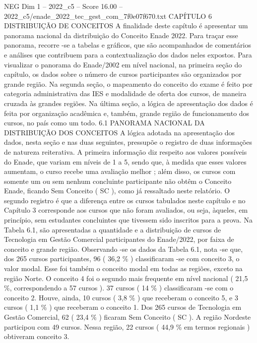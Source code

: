 \begin{textsample}{NEG Dim 1 – 2022\_c5 – Score 16.00 – 2022\_c5/enade\_2022\_tec\_gest\_com\_7f0e07f670.txt}  \label{ex:f1_neg_414}
CAPÍTULO 6 DISTRIBUIÇÃO DE CONCEITOS A finalidade deste capítulo é apresentar um panorama nacional da distribuição do Conceito Enade 2022.
Para traçar esse panorama, recorre -se a tabelas e gráficos, que são acompanhados de comentários e análises que contribuem para a contextualização dos dados neles expostos.
Para visualizar o panorama do Enade/2002 em nível nacional, na primeira seção do capítulo, os dados sobre o número de cursos participantes são organizados por grande região.
Na segunda seção, o mapeamento do conceito do exame é feito por categoria administrativa das IES e modalidade de oferta dos cursos, de maneira cruzada às grandes regiões.
Na última seção, a lógica de apresentação dos dados é feita por organização acadêmica e, também, grande região de funcionamento dos cursos, no país como um todo. 6.1 PANORAMA NACIONAL DA DISTRIBUIÇÃO DOS CONCEITOS A lógica adotada na apresentação dos dados, nesta seção e nas duas seguintes, pressupõe o registro de duas informações de natureza reiterativa.
A primeira informação diz respeito aos valores possíveis do Enade, que variam em níveis de 1 a 5, sendo que, à medida que esses valores aumentam, o curso recebe uma avaliação melhor ; além disso, os cursos com somente um ou sem nenhum concluinte participante não obtêm o Conceito Enade, ficando Sem Conceito ( SC ), como já ressaltado neste relatório.
O segundo registro é que a diferença entre os cursos tabulados neste capítulo e no Capítulo 3 corresponde aos cursos que não foram avaliados, ou seja, àqueles, em princípio, sem estudantes concluintes que tivessem sido inscritos para a prova.
Na Tabela 6.1, são apresentadas a quantidade e a distribuição de cursos de Tecnologia em Gestão Comercial participantes do Enade/2022, por faixa de conceito e grande região.
Observando -se os dados da Tabela 6.1, nota -se que, dos 265 cursos participantes, 96 ( 36,2 \% ) classificaram -se com conceito 3, o valor modal.
Esse foi também o conceito modal em todas as regiões, exceto na região Norte.
O conceito 4 foi o segundo mais frequente em nível nacional ( 21,5 \%, correspondendo a 57 cursos ). 37 cursos ( 14 \% ) classificaram -se com o conceito 2.
Houve, ainda, 10 cursos ( 3,8 \% ) que receberam o conceito 5, e 3 cursos ( 1,1 \% ) que receberam o conceito 1.
Dos 265 cursos de Tecnologia em Gestão Comercial, 62 ( 23,4 \% ) ficaram Sem Conceito ( SC ).
A região Nordeste participou com 49 cursos.
Nessa região, 22 cursos ( 44,9 \% em termos regionais ) obtiveram conceito 3.

\end{textsample}
